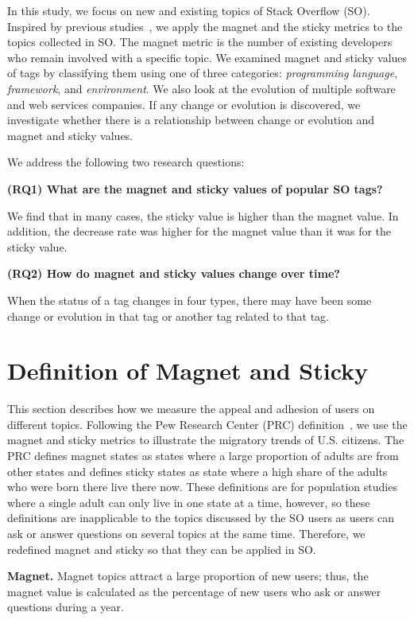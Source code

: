 \documentclass[conference]{IEEEtran}
\begin{document}
In this study, we focus on new and existing topics of Stack Overflow (SO). Inspired by previous studies~\cite{yamashita2016magnet}, we apply the magnet and the sticky metrics to the topics collected in SO. 
The magnet metric is the number of existing developers who remain involved with a specific topic.
We examined magnet and sticky values of tags by classifying them using one of three categories: \emph{programming language}, \emph{framework}, and \emph{environment}. We also look at the evolution of multiple software and web services companies. If any change or evolution is discovered, we investigate whether there is a relationship between change or evolution and magnet and sticky values.

We address the following two research questions:

\noindent \textbf{(RQ1) What are the magnet and sticky values of popular SO tags?}\par
We find that in many cases, the sticky value is higher than the magnet value. In addition, the decrease rate was higher for the magnet value than it was for the sticky value.

\noindent \textbf{(RQ2) How do magnet and sticky values change over time?}\par
When the status of a tag changes in four types, there may have been some change or evolution in that tag or another tag related to that tag.
\section{Definition of Magnet and Sticky} \label{magnet}
This section describes how we measure the appeal and adhesion of users on different topics. Following the Pew Research Center (PRC) definition~\cite{communityeconomic}, we use the magnet and sticky metrics to illustrate the migratory trends of U.S. citizens. The PRC defines magnet states as states where a large proportion of adults are from other states and defines sticky states as state where a high share of the adults who were born there live there now. These definitions are for population studies where a single adult can only live in one state at a time, however, so these definitions are inapplicable to the topics discussed by the SO users as users can ask or answer questions on several topics at the same time. Therefore, we redefined magnet and sticky so that they can be applied in SO. 

\noindent
\textbf{Magnet.} Magnet topics attract a large proportion of new users; thus, the magnet value is calculated as the percentage of new users who ask or answer questions during a year.
\end{document}
